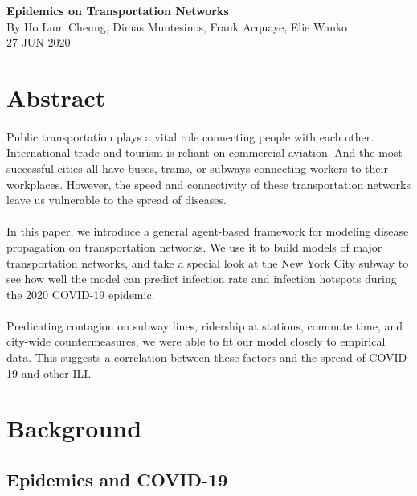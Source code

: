 \documentclass[12pt, a4, epsf] {article}
\theoremstyle{plain}
\theoremstyle{definition}
\begin{document}
\begin{center}

{\Large \textbf{Epidemics on Transportation Networks}\\}
By Ho Lum Cheung, Dimas Muntesinos, Frank Acquaye, Elie Wanko \\
27 JUN 2020
\end{center}

\section*{Abstract}
\paragraph{}
Public transportation plays a vital role connecting people with each other. International trade and tourism is reliant on commercial aviation. And the most successful cities all have buses, trams, or subways connecting workers to their workplaces. However, the speed and connectivity of these transportation networks leave us vulnerable to the spread of diseases.
\paragraph{}
In this paper, we introduce a general agent-based framework for modeling disease propagation on transportation networks. We use it to build models of major transportation networks, and take a special look at the New York City subway to see how well the model can predict infection rate and infection hotspots during the 2020 COVID-19 epidemic.
\paragraph{}
Predicating contagion on subway lines, ridership at stations, commute time, and city-wide countermeasures, we were able to fit our model closely to empirical data. This suggests a correlation between these factors and the spread of COVID-19 and other ILI.

\section{Background}
\subsection{Epidemics and COVID-19}
\end{document}
